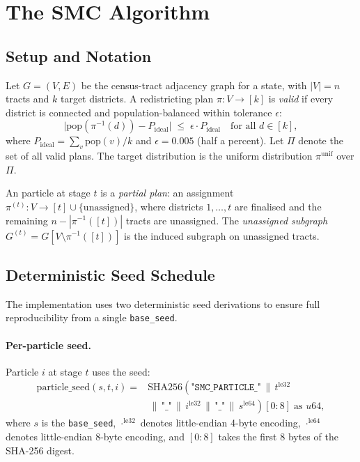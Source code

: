 \section{The SMC Algorithm}
\label{sec:algorithm}

\subsection{Setup and Notation}

Let $G = (V, E)$ be the census-tract adjacency graph for a state, with
$|V| = n$ tracts and $k$ target districts.
A redistricting plan $\pi : V \to [k]$ is \emph{valid} if every district is
connected and population-balanced within tolerance $\epsilon$:
\[
  \bigl|\mathrm{pop}(\pi^{-1}(d)) - P_{\mathrm{ideal}}\bigr|
  \;\leq\; \epsilon \cdot P_{\mathrm{ideal}}
  \quad\text{for all } d \in [k],
\]
where $P_{\mathrm{ideal}} = \sum_v \mathrm{pop}(v) / k$ and $\epsilon = 0.005$
(half a percent).
Let $\Pi$ denote the set of all valid plans.
The target distribution is the uniform distribution $\pi^{\mathrm{unif}}$ over
$\Pi$.

An \smc{} particle at stage $t$ is a \emph{partial plan}: an assignment
$\pi^{(t)} : V \to [t] \cup \{\mathrm{unassigned}\}$, where districts
$1, \ldots, t$ are finalised and the remaining $n - |\pi^{-1}([t])|$ tracts
are unassigned.
The \emph{unassigned subgraph} $G^{(t)} = G[V \setminus \pi^{-1}([t])]$ is
the induced subgraph on unassigned tracts.

\subsection{Deterministic Seed Schedule}

The \smc{} implementation uses two deterministic seed derivations to ensure
full reproducibility from a single \texttt{base\_seed}.

\paragraph{Per-particle seed.}
Particle $i$ at stage $t$ uses the seed:
\begin{align*}
  \mathrm{particle\_seed}(s, t, i)
  ={}& \mathrm{SHA256}\!\left(
    \texttt{"SMC\_PARTICLE\_"} \,\|\, t^{\mathrm{le32}}
  \right. \\
  &\left.
    \,\|\, \texttt{"\_"} \,\|\, i^{\mathrm{le32}}
    \,\|\, \texttt{"\_"} \,\|\, s^{\mathrm{le64}}
  \right)[0{:}8] \;\text{as } u64,
\end{align*}
where $s$ is the \texttt{base\_seed}, $\cdot^{\mathrm{le32}}$ denotes
little-endian 4-byte encoding, $\cdot^{\mathrm{le64}}$ denotes little-endian
8-byte encoding, and $[0{:}8]$ takes the first 8 bytes of the SHA-256 digest.

